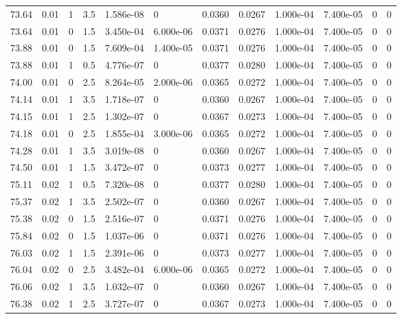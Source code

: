 \documentclass[preview]{standalone}
\begin{document}
{{{{{{{{\begin{tabular}{L{1.2cm}C{1.2cm} C{0.3cm}C{0.5cm} C{1.4cm}C{1.4cm} C{1.4cm}C{1.4cm} C{1.6cm}C{1.6cm} C{1.6cm}C{1.6cm}}
  73.64  &  0.01  & 1     & 3.5 &  1.586e-08  & 0  &  0.0360&   0.0267& 1.000e-04 & 7.400e-05   &  0 & 0  \\ 
  73.64  &  0.01  & 0     & 1.5 &  3.450e-04  & 6.000e-06  &  0.0371&   0.0276& 1.000e-04 & 7.400e-05   &  0 & 0  \\ 
  73.88  &  0.01  & 0     & 1.5 &  7.609e-04  & 1.400e-05  &  0.0371&   0.0276& 1.000e-04 & 7.400e-05   &  0 & 0  \\ 
  73.88  &  0.01  & 1     & 0.5 &  4.776e-07  & 0  &  0.0377&   0.0280& 1.000e-04 & 7.400e-05   &  0 & 0  \\ 
  74.00  &  0.01  & 0     & 2.5 &  8.264e-05  & 2.000e-06  &  0.0365&   0.0272& 1.000e-04 & 7.400e-05   &  0 & 0  \\ 
  74.14  &  0.01  & 1     & 3.5 &  1.718e-07  & 0  &  0.0360&   0.0267& 1.000e-04 & 7.400e-05   &  0 & 0  \\ 
  74.15  &  0.01  & 1     & 2.5 &  1.302e-07  & 0  &  0.0367&   0.0273& 1.000e-04 & 7.400e-05   &  0 & 0  \\ 
  74.18  &  0.01  & 0     & 2.5 &  1.855e-04  & 3.000e-06  &  0.0365&   0.0272& 1.000e-04 & 7.400e-05   &  0 & 0  \\ 
  74.28  &  0.01  & 1     & 3.5 &  3.019e-08  & 0  &  0.0360&   0.0267& 1.000e-04 & 7.400e-05   &  0 & 0  \\ 
  74.50  &  0.01  & 1     & 1.5 &  3.472e-07  & 0  &  0.0373&   0.0277& 1.000e-04 & 7.400e-05   &  0 & 0  \\ 
  75.11  &  0.02  & 1     & 0.5 &  7.320e-08  & 0  &  0.0377&   0.0280& 1.000e-04 & 7.400e-05   &  0 & 0  \\ 
  75.37  &  0.02  & 1     & 3.5 &  2.502e-07  & 0  &  0.0360&   0.0267& 1.000e-04 & 7.400e-05   &  0 & 0  \\ 
  75.38  &  0.02  & 0     & 1.5 &  2.516e-07  & 0  &  0.0371&   0.0276& 1.000e-04 & 7.400e-05   &  0 & 0  \\ 
  75.84  &  0.02  & 0     & 1.5 &  1.037e-06  & 0  &  0.0371&   0.0276& 1.000e-04 & 7.400e-05   &  0 & 0  \\ 
  76.03  &  0.02  & 1     & 1.5 &  2.391e-06  & 0  &  0.0373&   0.0277& 1.000e-04 & 7.400e-05   &  0 & 0  \\ 
  76.04  &  0.02  & 0     & 2.5 &  3.482e-04  & 6.000e-06  &  0.0365&   0.0272& 1.000e-04 & 7.400e-05   &  0 & 0  \\ 
  76.06  &  0.02  & 1     & 3.5 &  1.032e-07  & 0  &  0.0360&   0.0267& 1.000e-04 & 7.400e-05   &  0 & 0  \\ 
  76.38  &  0.02  & 1     & 2.5 &  3.727e-07  & 0  &  0.0367&   0.0273& 1.000e-04 & 7.400e-05   &  0 & 0  \\ 

\end{tabular}}}}}}}}}
\end{document}
